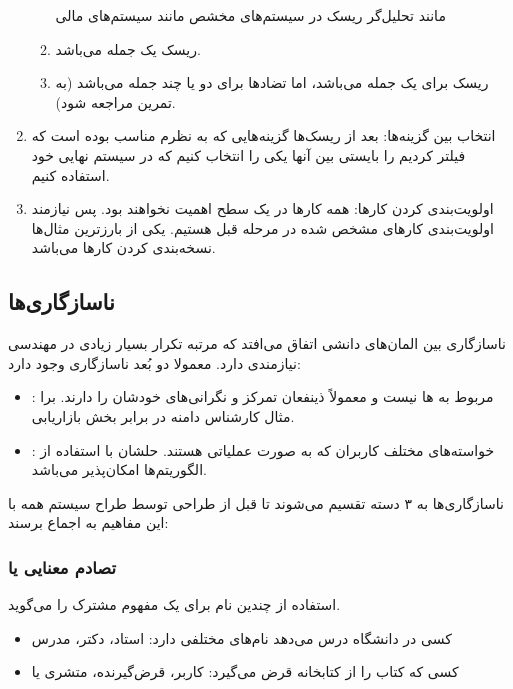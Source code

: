 \begin{enumerate}
\begin{enumerate}
        مانند تحلیل‌گر ریسک در سیستم‌های مخشص مانند سیستم‌های مالی
        \item ریسک  یک جمله می‌باشد.
        \item ریسک برای یک جمله می‌باشد، اما تضاد‌ها برای دو یا چند جمله می‌باشد
        (به تمرین  مراجعه شود).
    \end{enumerate}
    \item انتخاب بین گزینه‌ها: بعد از ریسک‌ها گزینه‌هایی که به نظرم مناسب بوده
    است که فیلتر کردیم را بایستی بین آنها یکی را انتخاب کنیم که در سیستم نهایی
    خود استفاده کنیم.
    \item اولویت‌بندی کردن کار‌ها: همه کار‌ها در یک سطح اهمیت نخواهند بود. پس
    نیازمند اولویت‌بندی کار‌های مشخص شده در مرحله قبل هستیم. یکی از بارزترین
    مثال‌ها نسخه‌بندی کردن کار‌ها می‌باشد.
\end{enumerate}

\subsection{ناسازگاری‌ها}

ناسازگاری بین المان‌های دانشی اتفاق می‌افتد که مرتبه تکرار بسیار زیادی در مهندسی
نیازمندی دارد. معمولا دو بُعد ناسازگاری وجود دارد:

\begin{itemize}
    \item {}: مربوط به ها نیست و معمولاً ذینفعان تمرکز
    و نگرانی‌های خودشان را دارند. برا مثال کارشناس دامنه در برابر بخش بازاریابی.
    \item {}: خواسته‌های مختلف کاربران که به صورت عملیاتی
    هستند. حلشان با استفاده از الگوریتم‌ها امکان‌پذیر می‌باشد.
\end{itemize}

ناسازگاری‌ها به ۳ دسته تقسیم می‌شوند تا قبل از طراحی توسط طراح سیستم همه با این
مفاهیم به اجماع برسند:

\subsubsection{تصادم معنایی یا }

استفاده از چندین نام برای یک مفهوم مشترک را می‌گوید.

\begin{itemize}
    \item کسی در دانشگاه درس می‌دهد نام‌های مختلفی دارد: استاد، دکتر، مدرس
    \item کسی که کتاب را از کتابخانه قرض می‌گیرد: کاربر، قرض‌گیرنده، متشری یا
\end{itemize}

